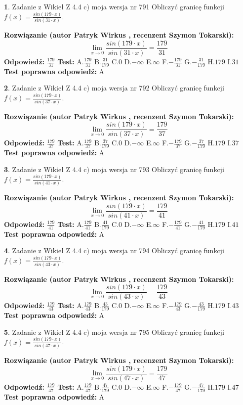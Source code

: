\documentclass[12pt, a4paper]{article}
\theoremstyle{definition} %
\newtheorem{zad}{}
\newcommand{\zadStart}[1]{\begin{zad}#1\newline}
\newcommand{\zadStop}{\end{zad}}
\newcommand{\rozwStart}[2]{\noindent \textbf{Rozwiązanie (autor #1 , recenzent #2): }\newline}
\newcommand{\rozwStop}{\newline}
\newcommand{\odpStart}{\noindent \textbf{Odpowiedź:}\newline}
\newcommand{\odpStop}{\newline}
\newcommand{\testStart}{\noindent \textbf{Test:}\newline}
\newcommand{\testStop}{\newline}
\newcommand{\kluczStart}{\noindent \textbf{Test poprawna odpowiedź:}\newline}
\newcommand{\kluczStop}{\newline}
\begin{document}
\zadStart{Zadanie z Wikieł Z 4.4 c) moja wersja nr 791}
Obliczyć granicę funkcji $f(x)=\frac{sin(179\cdot x)}{sin(31\cdot x)}$.
\zadStop
\rozwStart{Patryk Wirkus}{Szymon Tokarski}
$$\lim\limits_{x\to 0}\frac{sin(179\cdot x)}{sin(31\cdot x)}=
\frac{179}{31}$$
\rozwStop
\odpStart
$\frac{179}{31}$
\odpStop
\testStart
A.$\frac{179}{31}$
B.$\frac{31}{179}$
C.$0$
D.$-\infty$
E.$\infty$
F.$-\frac{179}{31}$
G.$-\frac{31}{179}$
H.$179$
I.$31$
\testStop
\kluczStart
A
\kluczStop



\zadStart{Zadanie z Wikieł Z 4.4 c) moja wersja nr 792}
Obliczyć granicę funkcji $f(x)=\frac{sin(179\cdot x)}{sin(37\cdot x)}$.
\zadStop
\rozwStart{Patryk Wirkus}{Szymon Tokarski}
$$\lim\limits_{x\to 0}\frac{sin(179\cdot x)}{sin(37\cdot x)}=
\frac{179}{37}$$
\rozwStop
\odpStart
$\frac{179}{37}$
\odpStop
\testStart
A.$\frac{179}{37}$
B.$\frac{37}{179}$
C.$0$
D.$-\infty$
E.$\infty$
F.$-\frac{179}{37}$
G.$-\frac{37}{179}$
H.$179$
I.$37$
\testStop
\kluczStart
A
\kluczStop



\zadStart{Zadanie z Wikieł Z 4.4 c) moja wersja nr 793}
Obliczyć granicę funkcji $f(x)=\frac{sin(179\cdot x)}{sin(41\cdot x)}$.
\zadStop
\rozwStart{Patryk Wirkus}{Szymon Tokarski}
$$\lim\limits_{x\to 0}\frac{sin(179\cdot x)}{sin(41\cdot x)}=
\frac{179}{41}$$
\rozwStop
\odpStart
$\frac{179}{41}$
\odpStop
\testStart
A.$\frac{179}{41}$
B.$\frac{41}{179}$
C.$0$
D.$-\infty$
E.$\infty$
F.$-\frac{179}{41}$
G.$-\frac{41}{179}$
H.$179$
I.$41$
\testStop
\kluczStart
A
\kluczStop



\zadStart{Zadanie z Wikieł Z 4.4 c) moja wersja nr 794}
Obliczyć granicę funkcji $f(x)=\frac{sin(179\cdot x)}{sin(43\cdot x)}$.
\zadStop
\rozwStart{Patryk Wirkus}{Szymon Tokarski}
$$\lim\limits_{x\to 0}\frac{sin(179\cdot x)}{sin(43\cdot x)}=
\frac{179}{43}$$
\rozwStop
\odpStart
$\frac{179}{43}$
\odpStop
\testStart
A.$\frac{179}{43}$
B.$\frac{43}{179}$
C.$0$
D.$-\infty$
E.$\infty$
F.$-\frac{179}{43}$
G.$-\frac{43}{179}$
H.$179$
I.$43$
\testStop
\kluczStart
A
\kluczStop



\zadStart{Zadanie z Wikieł Z 4.4 c) moja wersja nr 795}
Obliczyć granicę funkcji $f(x)=\frac{sin(179\cdot x)}{sin(47\cdot x)}$.
\zadStop
\rozwStart{Patryk Wirkus}{Szymon Tokarski}
$$\lim\limits_{x\to 0}\frac{sin(179\cdot x)}{sin(47\cdot x)}=
\frac{179}{47}$$
\rozwStop
\odpStart
$\frac{179}{47}$
\odpStop
\testStart
A.$\frac{179}{47}$
B.$\frac{47}{179}$
C.$0$
D.$-\infty$
E.$\infty$
F.$-\frac{179}{47}$
G.$-\frac{47}{179}$
H.$179$
I.$47$
\testStop
\kluczStart
A
\kluczStop
\end{document}
